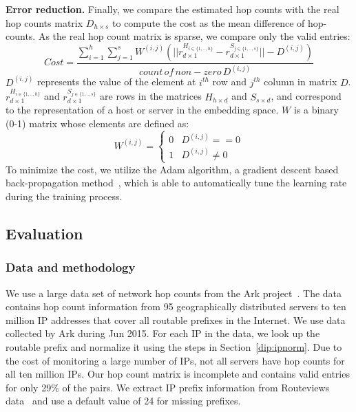 \textbf{Error reduction.} Finally, we compare the estimated hop counts with the real hop counts matrix $D_{h\times s}$ to compute the cost as the mean difference of hop-counts. 
As the real hop count matrix is sparse, we compare only the valid entries:
\begin{equation} 
\label{equ:cost} 
Cost = \frac{\sum_{i=1}^{h} \sum_{j=1}^{s}W^{(i,j)}(||r^{H_{i\in{\{1,..,h\}}}}_{d\times1} - r^{S_{j\in{\{1,..,s\}}}}_{d\times1}|| - D^{(i,j)})}{count\, of\, non-zero\, D^{(i,j)}} 
\end{equation}
$D^{(i,j)}$ represents the value of the element at $i^{th}$ row  and $j^{th}$ column in matrix $D$. $r^{H_{i\in{\{1,..,h\}}}}_{d\times1}$ and $r^{S_{j\in{\{1,..,s\}}}}_{d\times1}$ are rows in the matrices $H_{h\times d}$ and $S_{s\times d}$, and correspond to the representation of a host or server in the embedding space. $W$ is a binary (0-1) matrix whose elements are defined as:
\begin{equation}    W^{(i,j)} =
\begin{cases}
0   &  \text{$D^{(i,j)} == 0 $} \\
1    &  \text{$D^{(i,j)} \neq 0$ } 
\end{cases}                \end{equation}
To minimize the cost, we utilize the Adam algorithm, a gradient descent based back-propagation method~\citep{kingma2014adam}, which is able to automatically tune the learning rate during the training process.


\subsection{Evaluation}
\label{dip:eval}

\subsubsection{Data and methodology}
\label{subsec:data}

We use a large data set of network hop counts from the Ark project~\citep{ark}. The data contains hop count information from 95 geographically distributed servers to ten million IP addresses that cover all routable prefixes in the Internet. We use data collected by Ark during Jun 2015. For each IP in the data, we look up the routable prefix and normalize it using the steps in Section~\ref{dip:ipnorm}.
%
Due to the cost of monitoring a large number of IPs, not all servers have hop counts for all ten million IPs. Our hop count matrix is incomplete and contains valid entries for only 29\% of the pairs. We extract IP prefix information from Routeviews data~\citep{routeviews} and use a default value of 24 for missing prefixes.


